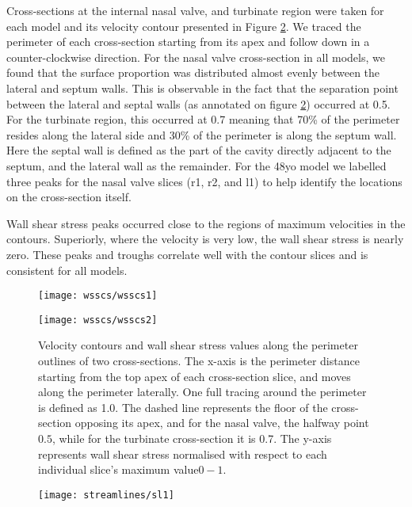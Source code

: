 Cross-sections at the internal nasal valve, and turbinate region were taken for each model and its velocity contour presented in Figure \ref{fig:wcs}. We traced the perimeter of each cross-section starting from its apex and follow down in a counter-clockwise direction. For the nasal valve cross-section in all models, we found that the surface proportion was distributed almost evenly between the lateral and septum walls. This is observable in the fact that the separation point between the lateral and septal walls (as annotated on figure \ref{fig:wcs}) occurred at 0.5. For the turbinate region, this occurred at 0.7 meaning that 70\% of the perimeter resides along the lateral side and 30\% of the perimeter is along the septum wall. Here the septal wall is defined as the part of the cavity directly adjacent to the septum, and the lateral wall as the remainder. For the 48yo model we labelled three peaks for the nasal valve slices (r1, r2, and l1) to help identify the locations on the cross-section itself. 

Wall shear stress peaks occurred close to the regions of maximum velocities in the contours. Superiorly, where the velocity is very low, the wall shear stress is nearly zero. These peaks and troughs correlate well with the contour slices and is consistent for all models.

\begin{figure} 
  \texttt{[image: wsscs/wsscs1]}
  \label{fig:wcs}
\end{figure}

\begin{figure} 
  \texttt{[image: wsscs/wsscs2]}
  \caption{Velocity contours and wall shear stress values along the perimeter outlines of two cross-sections. The x-axis is the perimeter distance starting from the top apex of each cross-section slice, and moves along the perimeter laterally. One full tracing around the perimeter is defined as 1.0. The dashed line represents the floor of the cross-section opposing its apex, and for the nasal valve, the halfway point \(0.5\), while for the turbinate cross-section it is 0.7. The y-axis represents wall shear stress normalised with respect to each individual slice's maximum value\(0 - 1\).}
  \label{fig:wcs}
\end{figure}

\begin{figure} 
  \texttt{[image: streamlines/sl1]}
  \end{figure}

